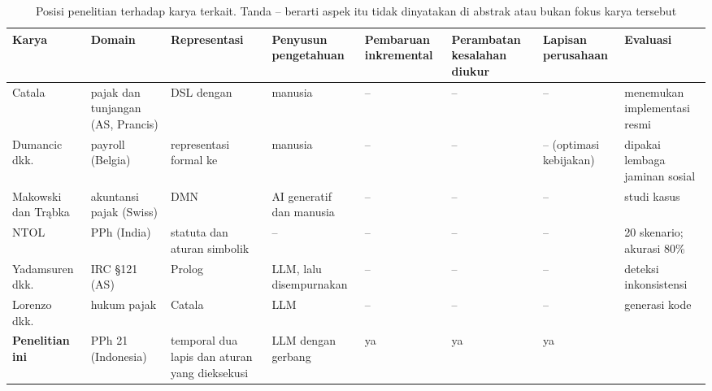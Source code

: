 \begin{table}[t]
\centering
\caption{Posisi penelitian terhadap karya terkait. Tanda -- berarti aspek itu tidak dinyatakan di abstrak atau bukan fokus karya tersebut}
\label{tab:posisi}
\scriptsize
\begin{tabularx}{\textwidth}{@{}P{2.6cm} P{1.9cm} L P{1.9cm} P{1.6cm} P{1.5cm} P{1.4cm} P{2.3cm}@{}}
\toprule
\textbf{Karya} & \textbf{Domain} & \textbf{Representasi} & \textbf{Penyusun pengetahuan} & \textbf{Pembaruan inkremental} & \textbf{Perambatan kesalahan diukur} & \textbf{Lapisan perusahaan} & \textbf{Evaluasi} \\
\midrule
Catala~\cite{merigoux2021catala} & pajak dan tunjangan (AS, Prancis) & DSL dengan  & manusia & -- & -- & -- & menemukan  implementasi resmi \\
Dumancic dkk.~\cite{dumancic2021payroll} & payroll (Belgia) & representasi formal ke  & manusia & -- & -- & -- (optimasi kebijakan) & dipakai lembaga jaminan sosial \\
Makowski dan Tr\k{a}bka~\cite{makowski2025dmn} & akuntansi pajak (Swiss) & DMN & AI generatif dan manusia & -- & -- & -- & studi kasus \\
NTOL~\cite{veeramani2026neurosymbolic} & PPh (India) &  statuta dan aturan simbolik & -- & -- & -- & -- & 20 skenario; akurasi 80\% \\
Yadamsuren dkk.~\cite{yadamsuren2026formalization} & IRC \S121 (AS) & Prolog & LLM, lalu disempurnakan & -- & -- & -- & deteksi inkonsistensi \\
Lorenzo dkk.~\cite{lorenzo2025translating} & hukum pajak & Catala & LLM & -- & -- & -- &  generasi kode \\
\midrule
\textbf{Penelitian ini} & PPh 21 (Indonesia) &  temporal dua lapis dan aturan yang dieksekusi & LLM dengan gerbang & ya & ya & ya &  \\
\bottomrule
\end{tabularx}
\end{table}

